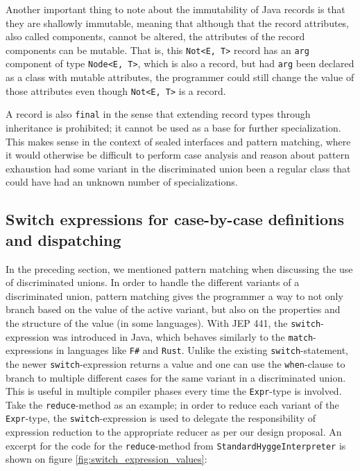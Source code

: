 Another important thing to note about the immutability of Java records is that they are shallowly immutable, meaning that although that the record
attributes, also called components, cannot be altered, the attributes of the record components can be mutable. That is, this \texttt{Not<E, T>} record
has an \texttt{arg} component of type \texttt{Node<E, T>}, which is also a record, but had \texttt{arg} been declared as a class with mutable
attributes, the programmer could still change the value of those attributes even though \texttt{Not<E, T>} is a record.

A record is also \texttt{final} in the sense that extending record types through inheritance is prohibited; it cannot be used as a base for
further specialization. This makes sense in the context of sealed interfaces and pattern matching, where it would otherwise be difficult
to perform case analysis and reason about pattern exhaustion had some variant in the discriminated union been a regular class that could
have had an unknown number of specializations.

\subsection{Switch expressions for case-by-case definitions and dispatching}

In the preceding section, we mentioned pattern matching when discussing the use of discriminated unions. In order to handle the different variants
of a discriminated union, pattern matching gives the programmer a way to not only branch based on the value of the active variant, but also on
the properties and the structure of the value (in some languages). With JEP 441\cite{jep441}, the \texttt{switch}-expression was introduced in Java, which behaves
similarly to the \texttt{match}-expressions in languages like \texttt{F\#} and \texttt{Rust}. Unlike the existing \texttt{switch}-statement,
the newer \texttt{switch}-expression returns a value and one can use the \texttt{when}-clause to branch to multiple different cases for the
same variant in a discriminated union. This is useful in multiple compiler phases every time the \texttt{Expr}-type is involved. Take
the \texttt{reduce}-method as an example; in order to reduce each variant of the \texttt{Expr}-type, the \texttt{switch}-expression is used
to delegate the responsibility of expression reduction to the appropriate reducer as per our design proposal. An excerpt for the code
for the \texttt{reduce}-method from \texttt{StandardHyggeInterpreter} is shown on figure \ref{fig:switch_expression_values}:

